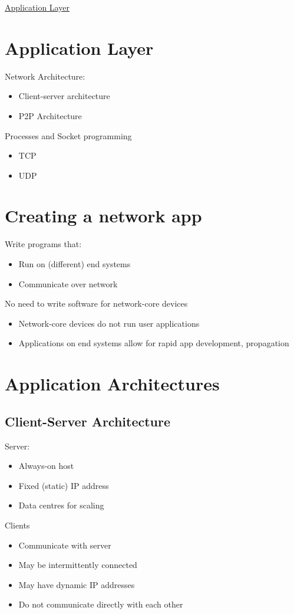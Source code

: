 \documentclass{article}[18pt]
\begin{document}
\begin{center}
\underline{\huge Application Layer}
\end{center}
\section{Application Layer}
Network Architecture:
\begin{itemize}
	\item Client-server architecture
	\item P2P Architecture
\end{itemize}
Processes and Socket programming
\begin{itemize}
	\item TCP
	\item UDP
\end{itemize}
\section{Creating a network app}
Write programs that:
\begin{itemize}
	\item Run on (different) end systems
	\item Communicate over network
\end{itemize}
No need to write software for network-core devices
\begin{itemize}
	\item Network-core devices do not run user applications
	\item Applications on end systems allow for rapid app development, propagation 
\end{itemize}
\section{Application Architectures}
\subsection{Client-Server Architecture}
Server:
\begin{itemize}
	\item Always-on host
	\item Fixed (static) IP address
	\item Data centres for scaling
\end{itemize}
Clients
\begin{itemize}
	\item Communicate with server
	\item May be intermittently connected
	\item May have dynamic IP addresses
	\item Do not communicate directly with each other
\end{itemize}
\end{document}
